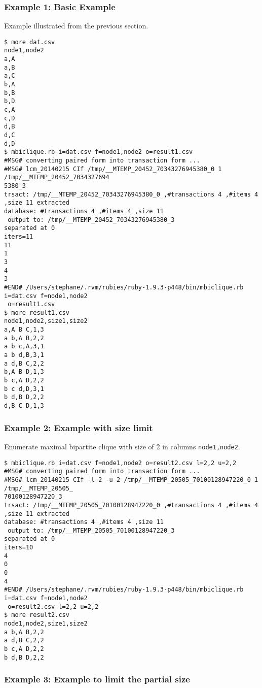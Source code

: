 \subsubsection*{Example 1: Basic Example}

Example illustrated from the previous section.


\begin{Verbatim}[baselinestretch=0.7,frame=single]
$ more dat.csv
node1,node2
a,A
a,B
a,C
b,A
b,B
b,D
c,A
c,D
d,B
d,C
d,D
$ mbiclique.rb i=dat.csv f=node1,node2 o=result1.csv
#MSG# converting paired form into transaction form ...
#MSG# lcm_20140215 CIf /tmp/__MTEMP_20452_70343276945380_0 1 /tmp/__MTEMP_20452_7034327694
5380_3
trsact: /tmp/__MTEMP_20452_70343276945380_0 ,#transactions 4 ,#items 4 ,size 11 extracted 
database: #transactions 4 ,#items 4 ,size 11
 output to: /tmp/__MTEMP_20452_70343276945380_3
separated at 0
iters=11
11
1
3
4
3
#END# /Users/stephane/.rvm/rubies/ruby-1.9.3-p448/bin/mbiclique.rb i=dat.csv f=node1,node2
 o=result1.csv
$ more result1.csv
node1,node2,size1,size2
a,A B C,1,3
a b,A B,2,2
a b c,A,3,1
a b d,B,3,1
a d,B C,2,2
b,A B D,1,3
b c,A D,2,2
b c d,D,3,1
b d,B D,2,2
d,B C D,1,3
\end{Verbatim}
\subsubsection*{Example 2: Example with size limit}

Enumerate maximal bipartite clique with size of 2 in columns \verb|node1,node2|.


\begin{Verbatim}[baselinestretch=0.7,frame=single]
$ mbiclique.rb i=dat.csv f=node1,node2 o=result2.csv l=2,2 u=2,2
#MSG# converting paired form into transaction form ...
#MSG# lcm_20140215 CIf -l 2 -u 2 /tmp/__MTEMP_20505_70100128947220_0 1 /tmp/__MTEMP_20505_
70100128947220_3
trsact: /tmp/__MTEMP_20505_70100128947220_0 ,#transactions 4 ,#items 4 ,size 11 extracted 
database: #transactions 4 ,#items 4 ,size 11
 output to: /tmp/__MTEMP_20505_70100128947220_3
separated at 0
iters=10
4
0
0
4
#END# /Users/stephane/.rvm/rubies/ruby-1.9.3-p448/bin/mbiclique.rb i=dat.csv f=node1,node2
 o=result2.csv l=2,2 u=2,2
$ more result2.csv
node1,node2,size1,size2
a b,A B,2,2
a d,B C,2,2
b c,A D,2,2
b d,B D,2,2
\end{Verbatim}
\subsubsection*{Example 3: Example to limit the partial size}

